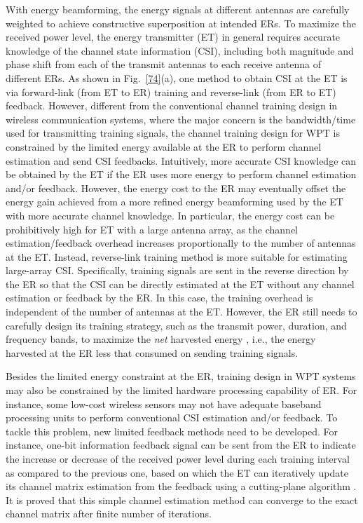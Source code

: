 \documentclass[journal, draftcls, one column, 12pt]{IEEEtran}
\begin{document}
With energy beamforming, the energy signals at different antennas are carefully weighted to achieve constructive superposition at intended ERs. To maximize the received power level, the energy transmitter (ET) in general requires accurate knowledge of the channel state information (CSI), including both magnitude and phase shift from each of the transmit antennas to each receive antenna of different ERs. As shown in Fig.~\ref{74}(a), one method to obtain CSI at the ET is via forward-link (from ET to ER) training and reverse-link (from ER to ET) feedback. However, different from the conventional channel training design in wireless communication systems, where the major concern is the bandwidth/time used for transmitting training signals, the channel training design for WPT is constrained by the limited energy available at the ER to perform channel estimation and send CSI feedbacks. Intuitively, more accurate CSI knowledge can be obtained by the ET if the ER uses more energy to perform channel estimation and/or feedback. However, the energy cost to the ER may eventually offset the energy gain achieved from a more refined energy beamforming used by the ET with more accurate channel knowledge. In particular, the energy cost can be prohibitively high for ET with a large antenna array, as the channel estimation/feedback overhead increases proportionally to the number of antennas at the ET. Instead, reverse-link training method is more suitable for estimating large-array CSI. Specifically, training signals are sent in the reverse direction by the ER so that the CSI can be directly estimated at the ET without any channel estimation or feedback by the ER. In this case, the training overhead is independent of the number of antennas at the ET. However, the ER still needs to carefully design its training strategy, such as the transmit power, duration, and frequency bands, to maximize the \emph{net} harvested energy \cite{2015:Zeng}, i.e., the energy harvested at the ER less that consumed on sending training signals.

Besides the limited energy constraint at the ER, training design in WPT systems may also be constrained by the limited hardware processing capability of ER. For instance, some low-cost wireless sensors may not have adequate baseband processing units to perform conventional CSI estimation and/or feedback. To tackle this problem, new limited feedback methods need to be developed. For instance, one-bit information feedback signal can be sent from the ER to indicate the increase or decrease of the received power level during each training interval as compared to the previous one, based on which the ET can iteratively update its channel matrix estimation from the feedback using a cutting-plane algorithm \cite{2014:Xu1}. It is proved that this simple channel estimation method can converge to the exact channel matrix after finite number of iterations.
\end{document}

